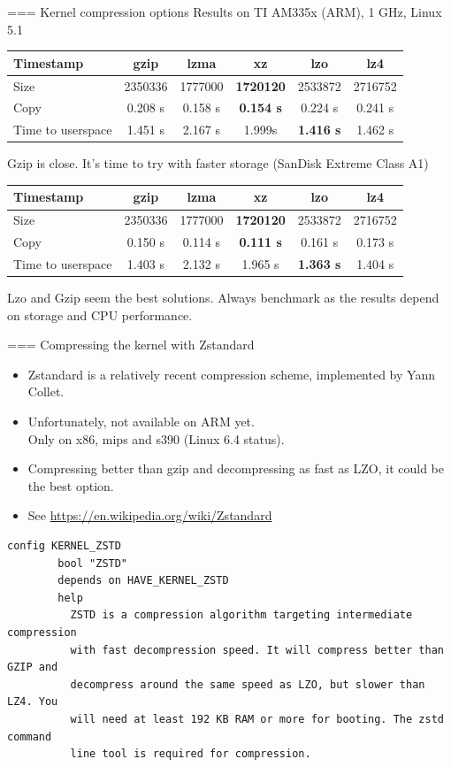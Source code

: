=== Kernel compression options Results on TI AM335x (ARM), 1 GHz, Linux 5.1
{\fontsize{7}{10}\selectfont
\begin{tabular}{| l || c | c | c | c | c |}
\hline Timestamp & gzip & lzma & xz & lzo & lz4 \\
\hline Size & 2350336 & 1777000 & {\bf 1720120} & 2533872 & 2716752 \\
Copy & 0.208 s & 0.158 s & {\bf 0.154 s} & 0.224 s & 0.241 s \\
Time to userspace & 1.451 s & 2.167 s & 1.999s & {\bf 1.416 s} & 1.462 s \\
\hline
\end{tabular}
}
\vfill{}
Gzip is close. It's time to try with faster storage (SanDisk Extreme Class A1)
{\fontsize{7}{10}\selectfont
\begin{tabular}{| l || c | c | c | c | c |}
\hline Timestamp & gzip & lzma & xz & lzo & lz4 \\
\hline Size & 2350336 & 1777000 & {\bf 1720120} & 2533872 & 2716752 \\
Copy & 0.150 s & 0.114 s & {\bf 0.111 s} & 0.161 s & 0.173 s \\
Time to userspace & 1.403 s & 2.132 s & 1.965 s & {\bf 1.363 s} & 1.404 s \\
\hline
\end{tabular}
}
\newline\newline Lzo and Gzip seem the best solutions. Always benchmark as the results depend on storage and CPU performance.


=== Compressing the kernel with Zstandard
\begin{itemize}
  \item Zstandard is a relatively recent compression scheme, implemented
        by Yann Collet.
  \item Unfortunately, not available on ARM yet.\\
        Only on x86, mips and s390 (Linux 6.4 status).
  \item Compressing better than gzip and decompressing as fast as LZO,
        it could be the best option.
  \item See \url{https://en.wikipedia.org/wiki/Zstandard}
\end{itemize}
\begin{block}{}
\small
\begin{verbatim}
config KERNEL_ZSTD
        bool "ZSTD"
        depends on HAVE_KERNEL_ZSTD
        help
          ZSTD is a compression algorithm targeting intermediate compression
          with fast decompression speed. It will compress better than GZIP and
          decompress around the same speed as LZO, but slower than LZ4. You
          will need at least 192 KB RAM or more for booting. The zstd command
          line tool is required for compression.
\end{verbatim}
\end{block}


